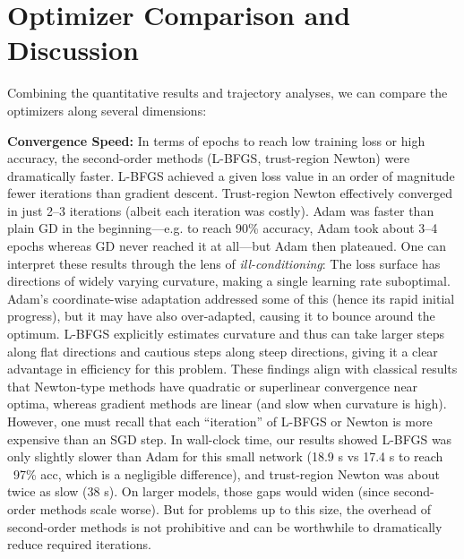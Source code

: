 \documentclass[12pt]{article}
\begin{document}
\section{Optimizer Comparison and Discussion} \label{optimizer-comparison}
Combining the quantitative results and trajectory analyses, we can compare the optimizers along several dimensions:

\textbf{Convergence Speed:} In terms of epochs to reach low training loss or high accuracy, the second-order methods (L-BFGS, trust-region Newton) were dramatically faster. L-BFGS achieved a given loss value in an order of magnitude fewer iterations than gradient descent. Trust-region Newton effectively converged in just 2–3 iterations (albeit each iteration was costly). Adam was faster than plain GD in the beginning—e.g. to reach 90\% accuracy, Adam took about 3–4 epochs whereas GD never reached it at all—but Adam then plateaued. One can interpret these results through the lens of \emph{ill-conditioning}: The loss surface has directions of widely varying curvature, making a single learning rate suboptimal. Adam’s coordinate-wise adaptation addressed some of this (hence its rapid initial progress), but it may have also over-adapted, causing it to bounce around the optimum. L-BFGS explicitly estimates curvature and thus can take larger steps along flat directions and cautious steps along steep directions, giving it a clear advantage in efficiency for this problem. These findings align with classical results that Newton-type methods have quadratic or superlinear convergence near optima, whereas gradient methods are linear (and slow when curvature is high). However, one must recall that each “iteration” of L-BFGS or Newton is more expensive than an SGD step. In wall-clock time, our results showed L-BFGS was only slightly slower than Adam for this small network (18.9 s vs 17.4 s to reach ~97\% acc, which is a negligible difference), and trust-region Newton was about twice as slow (38 s). On larger models, those gaps would widen (since second-order methods scale worse). But for problems up to this size, the overhead of second-order methods is not prohibitive and can be worthwhile to dramatically reduce required iterations.
\end{document}

